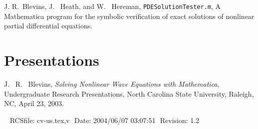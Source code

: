 \documentclass[margin,line,11pt,draft]{res}
\begin{document}
\begin{resume}
J. R.\ Blevins, J. \ Heath, and W. \ Hereman,
  \texttt{PDESolutionTester.m},  A Mathematica program for the symbolic
  verification of exact solutions of nonlinear partial differential
  equations.

\section{\sc Presentations}


J. \ R. \ Blevins, {\em Solving Nonlinear Wave Equations with
Mathematica}, Undergraduate Research Presentations, North Carolina
State University, Raleigh, NC, April 23, 2003.

\vspace{\fill}\ \newline
{\tiny \rm $ $RCSfile: cv-us.tex,v $ $ }
{\tiny \rm $ $Date: 2004/06/07 03:07:51 $ $ }
{\tiny \rm $ $Revision: 1.2 $ $ }


\end{resume}
\end{document}
